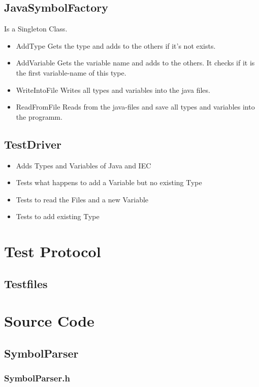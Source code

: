 \subsection{JavaSymbolFactory}
Is a Singleton Class.
\begin{itemize}
	\item AddType
	\subitem Gets the type and adds to the others if it's not exists.
	\item AddVariable
	\subitem Gets the variable name and adds to the others. It checks if it is the first variable-name of this type.
	\item WriteIntoFile
	\subitem Writes all types and variables into the java files.
	\item ReadFromFile
	 \subitem Reads from the java-files and save all types and variables into the programm.
\end{itemize}

\subsection{TestDriver}
\begin{itemize}
	\item Adds Types and Variables of Java and IEC
	\item Tests what happens to add a Variable but no existing Type
	\item Tests to read the Files and a new Variable
	\item Tests to add existing Type 
\end{itemize}

\newpage
\section{Test Protocol}

\subsection{Testfiles}


\newpage
\section{Source Code}

\subsection{SymbolParser}
\subsubsection{SymbolParser.h}
